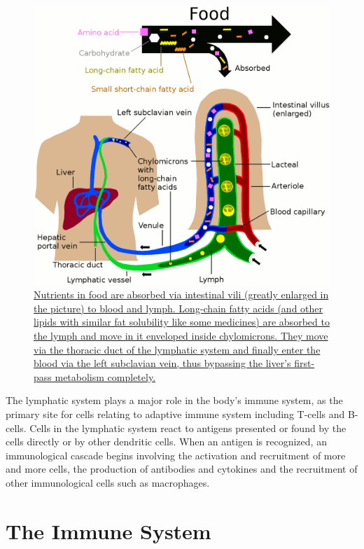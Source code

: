 \begin{figure}

{\centering \includegraphics[width=0.7\linewidth]{./figures/immune/Nutrient_absorbtion_to_blood_and_lymph} 

}

\caption{\href{https://commons.wikimedia.org/wiki/File:Nutrient_absorbtion_to_blood_and_lymph.png}{Nutrients in food are absorbed via intestinal vili (greatly enlarged in the picture) to blood and lymph. Long-chain fatty acids (and other lipids with similar fat solubility like some medicines) are absorbed to the lymph and move in it enveloped inside chylomicrons. They move via the thoracic duct of the lymphatic system and finally enter the blood via the left subclavian vein, thus bypassing the liver's first-pass metabolism completely.}}\label{fig:lymphnutrient}
\end{figure}

The lymphatic system plays a major role in the body's immune system, as the primary site for cells relating to adaptive immune system including T-cells and B-cells. Cells in the lymphatic system react to antigens presented or found by the cells directly or by other dendritic cells. When an antigen is recognized, an immunological cascade begins involving the activation and recruitment of more and more cells, the production of antibodies and cytokines and the recruitment of other immunological cells such as macrophages.

\hypertarget{the-immune-system}{%
\section{The Immune System}\label{the-immune-system}}

